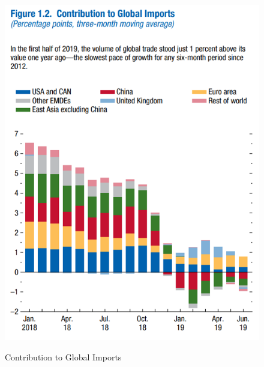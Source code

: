 \begin{figure}[!h]
\centering
\begin{minipage}[t]{.7\textwidth} %
\caption{Contribution to Global Imports} %
\includegraphics[width=1\textwidth]{img/globalimports.png}\\ %
\label{fig:weoexample2}
\end{minipage}
\end{figure}

